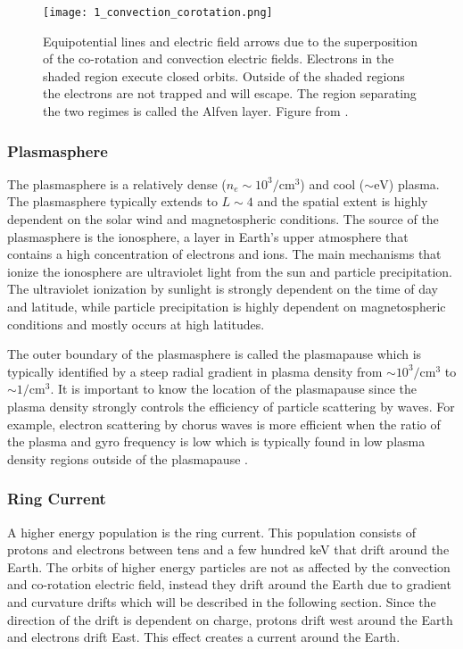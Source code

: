 \begin{figure}
\texttt{[image: 1\_convection\_corotation.png]}
\caption{Equipotential lines and electric field arrows due to the superposition of the co-rotation and convection electric fields. Electrons in the shaded region execute closed orbits. Outside of the shaded regions the electrons are not trapped and will escape. The region separating the two regimes is called the Alfven layer. Figure from \citet{Baumjohann1997}.}
\label{Intro:E_fields}
\end{figure}

\subsubsection{Plasmasphere}
The plasmasphere is a relatively dense ($n_e \sim 10^3/\mathrm{cm}^3$) and cool ($\sim \mathrm{eV}$) plasma. The plasmasphere typically extends to $L \sim 4$ and the spatial extent is highly dependent on the solar wind and magnetospheric conditions. The source of the plasmasphere is the ionosphere, a layer in Earth's upper atmosphere that contains a high concentration of electrons and ions. The main mechanisms that ionize the ionosphere are ultraviolet light from the sun and particle precipitation. The ultraviolet ionization by sunlight is strongly dependent on the time of day and latitude, while particle precipitation is highly dependent on magnetospheric conditions and mostly occurs at high latitudes.

The outer boundary of the plasmasphere is called the plasmapause which is typically identified by a steep radial gradient in plasma density from $\sim 10^3 / \mathrm{cm}^3$ to $\sim 1 / \mathrm{cm}^3$. It is important to know the location of the plasmapause since the plasma density strongly controls the efficiency of particle scattering by waves. For example, electron scattering by chorus waves is more efficient when the ratio of the plasma and gyro frequency is low which is typically found in low plasma density regions outside of the plasmapause \citep[e.g.][]{Horne2003c, Horne2005, O'Brien2003empirical}.

\subsubsection{Ring Current}
A higher energy population is the ring current. This population consists of protons and electrons between tens and a few hundred keV that drift around the Earth. The orbits of higher energy particles are not as affected by the convection and co-rotation electric field, instead they drift around the Earth due to gradient and curvature drifts which will be described in the following section. Since the direction of the drift is dependent on charge, protons drift west around the Earth and electrons drift East. This effect creates a current around the Earth. 

